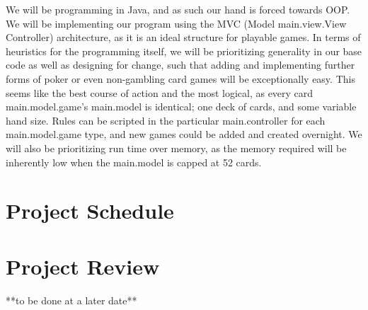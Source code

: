 \documentclass{article}
\begin{document}
We will be programming in Java, and as such our hand is forced towards OOP. We will be implementing our program using the MVC (Model main.view.View Controller) architecture, as it is an ideal structure for playable games. In terms of heuristics for the programming itself, we will be prioritizing generality in our base code as well as designing for change, such that adding and implementing further forms of poker or even non-gambling card games will be exceptionally easy. This seems like the best course of action and the most logical, as every card main.model.game's main.model is identical; one deck of cards, and some variable hand size. Rules can be scripted in the particular main.controller for each main.model.game type, and new games could be added and created overnight. We will also be prioritizing run time over memory, as the memory required will be inherently low when the main.model is capped at 52 cards.

\section{Project Schedule}



\section{Project Review}
**to be done at a later date**
\end{document}
